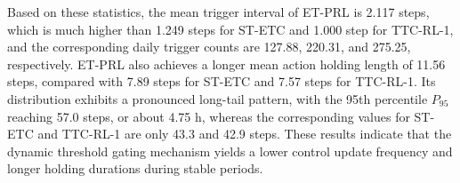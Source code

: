 ﻿\documentclass[preprint,12pt,number]{elsarticle}
\begin{document}
\begin{table}[htbp]
\centering
\caption{Temporal sparsity and action holding statistics of different control strategies}\label{tab:temporal-sparsity}
\small
\setlength{\tabcolsep}{8pt}
\renewcommand{\arraystretch}{1.15}
\end{table}

Based on these statistics, the mean trigger interval of ET-PRL is 2.117 steps, which is much higher than 1.249 steps for ST-ETC and 1.000 step for TTC-RL-1, and the corresponding daily trigger counts are 127.88, 220.31, and 275.25, respectively. ET-PRL also achieves a longer mean action holding length of 11.56 steps, compared with 7.89 steps for ST-ETC and 7.57 steps for TTC-RL-1. Its distribution exhibits a pronounced long-tail pattern, with the 95th percentile \(P_{95}\) reaching 57.0 steps, or about 4.75 h, whereas the corresponding values for ST-ETC and TTC-RL-1 are only 43.3 and 42.9 steps. These results indicate that the dynamic threshold gating mechanism yields a lower control update frequency and longer holding durations during stable periods.
\end{document}
